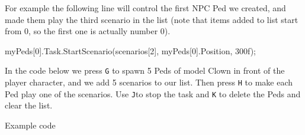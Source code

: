 \documentclass[
  openany]{book}
\newenvironment{Shaded}{\begin{snugshade}}{\end{snugshade}}
\newcommand{\DecValTok}[1]{\textcolor[rgb]{0.00,0.00,0.81}{#1}}
\newcommand{\FunctionTok}[1]{\textcolor[rgb]{0.00,0.00,0.00}{#1}}
\newcommand{\NormalTok}[1]{#1}
\begin{document}
For example the following line will control the first NPC Ped we created, and made them play the third scenario in the list (note that items added to list start from 0, so the first one is actually number 0).

\begin{Shaded}
\begin{Highlighting}[]
\NormalTok{myPeds[}\DecValTok{0}\NormalTok{].}\FunctionTok{Task}\NormalTok{.}\FunctionTok{StartScenario}\NormalTok{(scenarios[}\DecValTok{2}\NormalTok{], myPeds[}\DecValTok{0}\NormalTok{].}\FunctionTok{Position}\NormalTok{, 300f); }
\end{Highlighting}
\end{Shaded}

In the code below we press \texttt{G} to spawn 5 Peds of model Clown in front of the player character, and we add 5 scenarios to our list. Then press \texttt{H} to make each Ped play one of the scenarios. Use \texttt{J}to stop the task and \texttt{K} to delete the Peds and clear the list.

Example code
\end{document}
